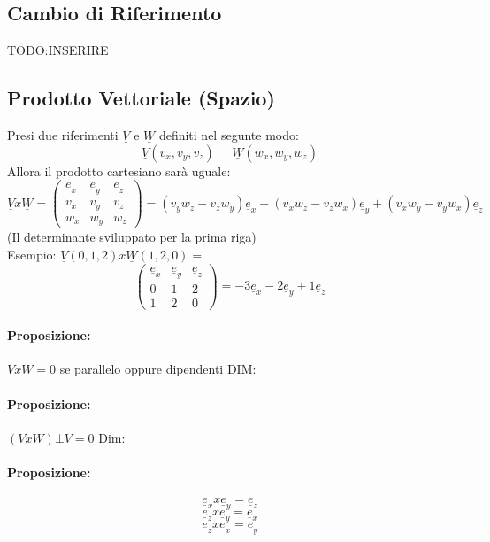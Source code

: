 \subsection{Cambio di Riferimento}
TODO:INSERIRE

\subsection{Prodotto Vettoriale (Spazio)}
Presi due riferimenti $\underline{V}$ e $\underline{W}$ definiti nel segunte modo:
$$ \underline{V}(v_x,v_y,v_z) \;\;\;\;\; \underline{W}(w_x,w_y,w_z) $$
Allora il prodotto cartesiano sarà uguale:
$$ \underline{V}x\underline{W} = \begin{pmatrix}
\underline{e}_x & \underline{e}_y & \underline{e}_z \\
v_x & v_y & v_z \\
w_x & w_y & w_z
\end{pmatrix} =
(v_yw_z - v_zw_y)\underline{e}_x - (v_xw_z - v_zw_x)\underline{e}_y + (v_xw_y - v_yw_x)\underline{e}_z $$
(Il determinante sviluppato per la prima riga)\\
Esempio: $\underline{V}(0,1,2)x\underline{W}(1,2,0) =$
$$ 
\begin{pmatrix}
\underline{e}_x & \underline{e}_y & \underline{e}_z \\
0 & 1 & 2 \\
1 & 2 & 0 
\end{pmatrix}
= -3\underline{e}_x-2\underline{e}_y+1\underline{e}_z
$$
\paragraph{Proposizione:} $VxW = \underline{0}$ se parallelo oppure dipendenti
DIM:\\
\paragraph{Proposizione:} $(VxW) \bot V=0$
Dim:\\
\paragraph{Proposizione:} 
$$ \underline{e}_x x \underline{e}_y = \underline{e}_z $$
$$ \underline{e}_z x \underline{e}_y = \underline{e}_x $$
$$ \underline{e}_z x \underline{e}_x = \underline{e}_y $$




